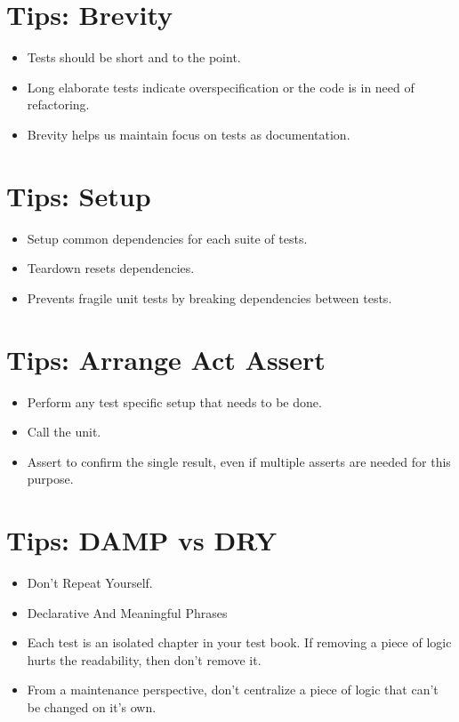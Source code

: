 \documentclass{article}
\begin{document}
\newpage
\section{Tips: Brevity}
\begin{itemize}
    \item Tests should be short and to the point.
    \item Long elaborate tests indicate overspecification or the code is in
        need of refactoring.
    \item Brevity helps us maintain focus on tests as documentation.
\end{itemize}

\newpage
\section{Tips: Setup}
\begin{itemize}
    \item Setup common dependencies for each suite of tests.
    \item Teardown resets dependencies.
    \item Prevents fragile unit tests by breaking dependencies between tests.
\end{itemize}

\newpage
\section{Tips: Arrange Act Assert}
\begin{itemize}
    \item Perform any test specific setup that needs to be done.
    \item Call the unit.
    \item Assert to confirm the single result, even if multiple asserts are
        needed for this purpose.
\end{itemize}

\newpage
\section{Tips: DAMP vs DRY}
\begin{itemize}
    \item Don't Repeat Yourself.
    \item Declarative And Meaningful Phrases
    \item Each test is an isolated chapter in your test book. If removing a
        piece of logic hurts the readability, then don't remove it.
    \item From a maintenance perspective, don't centralize a piece of logic that
        can't be changed on it's own.
\end{itemize}
\end{document}
